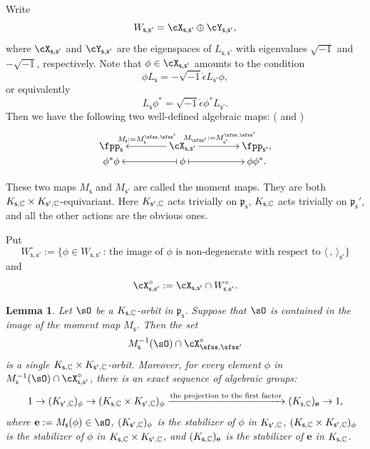 \documentclass[11pt,a4paper]{amsart}
\newcommand{\p}{\mathfrak p}
\newcommand{\la}{\langle}
\newcommand{\ra}{\rangle}
\newcommand{\be}{\begin {equation}}
\newcommand{\ee}{\end {equation}}
\numberwithin{equation}{section}
\newtheorem{lem}[thm]{Lemma}
\theoremstyle{remark}
\def\Vsp{V_{\sfss'}}
\def\Ls{L_\sfss}
\begin{document}
Write
\begin{equation}\label{def:Xss'}
   W_{\mathsf s, \mathsf s'}=\cX_{\mathsf s, \mathsf s'}\oplus  \cY_{\mathsf s, \mathsf s'},
\end{equation}
where $\cX_{\mathsf s, \mathsf s'}$ and $ \cY_{\mathsf s, \mathsf s'}$ are  the eigenspaces of $L_{\mathsf s, \mathsf s'}$ with eigenvalues $\sqrt{-1}$ and $-\sqrt{-1}$, respectively. Note that $\phi \in \cX_{\mathsf s, \mathsf s'}$ amounts to the condition
  \[
 \phi L_{\mathsf s}=-\sqrt{-1}\dot \epsilon L_{\mathsf s'}
\phi,\]
or equivalently
\begin{equation}\label{eq:eigen}
 L_{\mathsf s}\phi ^{*}=\sqrt{-1}\dot \epsilon \phi ^* L_{\mathsf s'}.
 \end{equation}
Then we have the following two well-defined algebraic maps: (\cite[Section 1]{KP} and \cite[Section 2]{NOZ})
  \be\label{momentmap}
    \xymatrix@R=0em@C=4em{
      \fpp_\mathsf s &\ar[l]_{M_\mathsf s:=M_\mathsf s^{\sfss, \sfss'}} \cX_{\mathsf s, \mathsf s'}\ar[r]^{M_{\sfss'}:=M_{\mathsf s'}^{\sfss, \sfss'}}& \fpp_{\mathsf s'},\\
     \phi^* \phi & \ar@{|->}[l] \phi \ar@{|->}[r] & \phi \phi^*.
    }
  \ee

These two maps $M_\mathsf s$ and $M_{\mathsf s'}$ are called the moment maps. They are both $K_{\mathsf s,\mathbb{C}}\times K_{\mathsf s', \mathbb{C}}$-equivariant. Here  $K_{\mathsf s', \mathbb{C}}$ acts trivially on $\p_\mathsf s$,
 $K_{\mathsf s, \mathbb{C}}$ acts trivially on $\p_\mathsf s'$, and all the other actions are the obvious ones.

Put
\[
  W_{\mathsf s, \mathsf s'}^\circ:=\{\phi\in W_{\mathsf s, \mathsf s'}\,:\, \textrm{the image of $\phi$ is non-degenerate with respect to $\la\,,\,\ra_{\mathsf s'}$}\}
\]
and
\[
  \cX_{\mathsf s, \mathsf s'}^\circ:=\cX_{\mathsf s, \mathsf s'}\cap W_{\mathsf s, \mathsf s'}^\circ.
\]


\def\Ms{M_{\sfss}}
\def\cXsso{\cX_{\sfss,\sfss'}^\circ}
\def\cXss{\cX_{\sfss,\sfss'}}
\def\Ksp{K_{\sfss',\bC}}
\def\Lsp{L_{\sfss'}}
\def\Ls{L_{\sfss}}
\def\Vsp{V_{\sfss'}}
\begin{lem}
  \label{descko}
Let $\sO$ be a $K_{\mathsf s, \mathbb{C}}$-orbit in $\p_{\mathsf s}$. Suppose that $\sO$ is contained in the image of the moment map $M_\mathsf s$. Then the set
\be\label{kkpo}
  M_{\mathsf s}^{-1}(\sO)\cap \cXsso
\ee
is a single $K_{\mathsf s,\mathbb{C}}\times K_{\mathsf s', \mathbb{C}}$-orbit. Moreover, for every element $\phi$ in $M_{\mathsf s}^{-1}(\sO)\cap \cX_{\mathsf s, \mathsf s'}^\circ$, there is an exact sequence of algebraic groups:
\[
  1\rightarrow (K_{\mathsf s',\mathbb{C}})_\phi \rightarrow (K_{\mathsf s,\mathbb{C}}\times K_{\mathsf s', \mathbb{C}})_\phi\xrightarrow{\textrm{the projection to the first factor}} (K_{\mathsf s,\mathbb{C}})_{\mathbf e}\rightarrow 1,
\]
where $\mathbf e:=M_\mathsf s(\phi)\in \sO$,  $(K_{\mathsf s',\mathbb{C}})_\phi$ is the stabilizer of $\phi$ in $K_{\mathsf s',\mathbb{C}}$, $(K_{\mathsf s,\mathbb{C}}\times K_{\mathsf s', \mathbb{C}})_\phi$ is the stabilizer of $\phi$ in $K_{\mathsf s,\mathbb{C}}\times K_{\mathsf s', \mathbb{C}}$, and $(K_{\mathsf s,\mathbb{C}})_{\mathbf e}$ is the stabilizer of $\mathbf e$ in $K_{\mathsf s,\mathbb{C}}$.
\end{lem}
\end{document}
